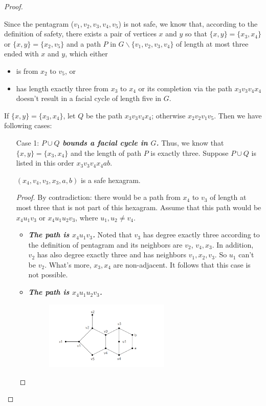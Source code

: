 \begin{proof}
\begin{itemize}
\end{itemize}
Since the pentagram ($v_1, v_2, v_3, v_4, v_5$) is not safe, we know that, according to the definition of safety, there exists a pair of vertices $x$ and $y$ so that $\{x, y\} = \{x_3, x_4\}$ or $\{x, y\} = \{x_2, v_5\}$ and a path $P$ in $G \backslash \{v_1, v_2, v_3, v_4\}$ of length at most three ended with $x$ and $y$, which either 
\begin{itemize}
    \item is from $x_2$ to $v_5$, or
    \item has length exactly three from $x_3$ to $x_4$ or its completion via the path $x_3v_3v_4x_4$ doesn't result in a facial cycle of length five in $G$.
\end{itemize}
If $\{x, y\} = \{x_3, x_4\}$, let $Q$ be the path $x_3v_3v_4x_4$; otherwise $x_2v_2v_1v_5$. Then we have following cases:
\begin{itemize}
    \item[Case 1:] \textit{\textbf{$P \cup Q$ bounds a facial cycle in $G$.}} Thus, we know that $\{x, y\} = \{x_3, x_4\}$ and the length of path $P$ is exactly three. Suppose $P \cup Q$ is listed in this order $x_3v_3v_4x_4ab$.
    \begin{claim}
    $(x_4, v_4, v_3, x_3, a, b)$ is a safe hexagram. 
    \end{claim}
    \begin{proof}
    By contradiction: there would be a path from $x_4$ to $v_3$ of length at most three that is not part of this hexagram. Assume that this path would be $x_4u_1v_3$ or $x_4u_1u_2v_3$, where $u_1, u_2 \ne v_4$.
    \begin{itemize}
        \item \textit{\textbf{The path is $x_4u_1v_3$.}} Noted that $v_3$ has degree exactly three according to the definition of pentagram and its neighbors are $v_2$, $v_4, x_3$. In addition, $v_2$ has also degree exactly three and has neighbors $v_1, x_2, v_3$. So $u_1$ can't be $v_2$. What's more, $x_3, x_4$ are non-adjacent. It follows that this case is not possible.
        \item \textit{\textbf{The path is $x_4u_1u_2v_3$.}} 
        \begin{figure}[H] %
            \centering %
            \includegraphics[width=0.6\textwidth]{figure/pcupqboundsaface.png} 

\end{figure}
\end{itemize}
\end{proof}
\end{itemize}
\end{proof}
